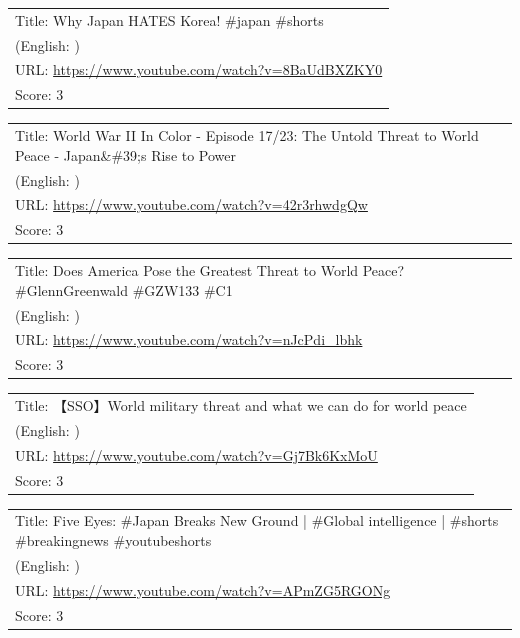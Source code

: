 \documentclass{article}
\begin{document}
\noindent
\begin{tabular}{p{}}
Title: Why Japan HATES Korea! \#japan \#shorts \\
(English: ) \\
URL: \url{https://www.youtube.com/watch?v=8BaUdBXZKY0} \\
Score: 3 \\
\end{tabular}
\vspace{0.5em}

\noindent
\begin{tabular}{p{}}
Title: World War II In Color - Episode 17/23: The Untold Threat to World Peace - Japan\&\#39;s Rise to Power \\
(English: ) \\
URL: \url{https://www.youtube.com/watch?v=42r3rhwdgQw} \\
Score: 3 \\
\end{tabular}
\vspace{0.5em}

\noindent
\begin{tabular}{p{}}
Title: Does America Pose the Greatest Threat to World Peace? \#GlennGreenwald \#GZW133 \#C1 \\
(English: ) \\
URL: \url{https://www.youtube.com/watch?v=nJcPdi_lbhk} \\
Score: 3 \\
\end{tabular}
\vspace{0.5em}

\noindent
\begin{tabular}{p{}}
Title: 【SSO】World military threat and what we can do for world peace \\
(English: ) \\
URL: \url{https://www.youtube.com/watch?v=Gj7Bk6KxMoU} \\
Score: 3 \\
\end{tabular}
\vspace{0.5em}

\noindent
\begin{tabular}{p{}}
Title: Five Eyes: \#Japan Breaks New Ground | \#Global intelligence | \#shorts \#breakingnews \#youtubeshorts \\
(English: ) \\
URL: \url{https://www.youtube.com/watch?v=APmZG5RGONg} \\
Score: 3 \\
\end{tabular}
\vspace{0.5em}
\end{document}
